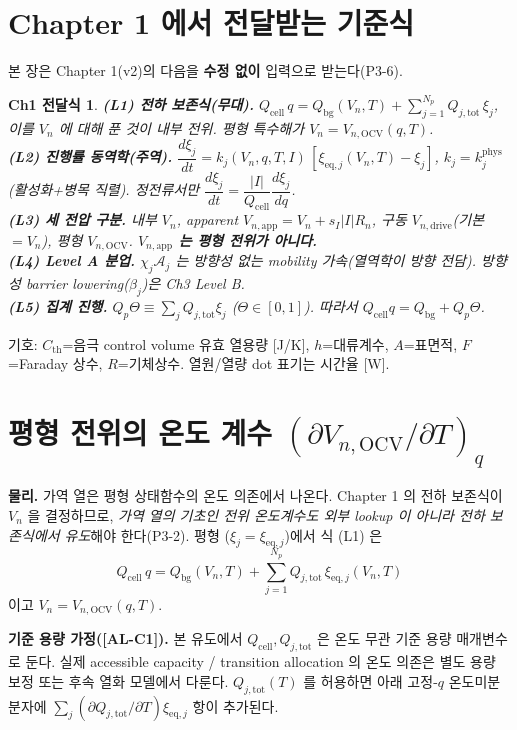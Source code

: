 \documentclass[11pt,a4paper]{article}
\newtheorem*{linkbox}{Ch1 전달식}
\newcommand{\eq}{\mathrm{eq}}
\newcommand{\app}{\mathrm{app}}
\newcommand{\drive}{\mathrm{drive}}
\newcommand{\tot}{\mathrm{tot}}
\newcommand{\bg}{\mathrm{bg}}
\newcommand{\cell}{\mathrm{cell}}
\newcommand{\OCV}{\mathrm{OCV}}
\newcommand{\AL}[1]{\textsf{[AL-#1]}}
\begin{document}
\section{Chapter 1 에서 전달받는 기준식}\label{sec:ch2_inherit}
본 장은 Chapter 1(v2)의 다음을 \textbf{수정 없이} 입력으로 받는다(P3-6).
\begin{linkbox}
\textbf{(L1) 전하 보존식(무대).} $Q_\cell\,q=Q_\bg(V_n,T)+\sum_{j=1}^{N_p}Q_{j,\tot}\,\xi_j$, 이를 $V_n$ 에
대해 푼 것이 내부 전위. 평형 특수해가 $V_n=V_{n,\OCV}(q,T)$.\\
\textbf{(L2) 진행률 동역학(주역).} $\dfrac{d\xi_j}{dt}=k_j(V_n,q,T,I)\,[\xi_{\eq,j}(V_n,T)-\xi_j]$,
$k_j=k_j^{\mathrm{phys}}$(활성화+병목 직렬). 정전류서만 $\dfrac{d\xi_j}{dt}=\dfrac{|I|}{Q_\cell}\dfrac{d\xi_j}{dq}$.\\
\textbf{(L3) 세 전압 구분.} 내부 $V_n$, apparent $V_{n,\app}=V_n+s_I|I|R_n$, 구동 $V_{n,\drive}$(기본 $=V_n$),
평형 $V_{n,\OCV}$. \textbf{$V_{n,\app}$ 는 평형 전위가 아니다.}\\
\textbf{(L4) Level A 분업.} $\chi_j\mathcal A_j$ 는 방향성 없는 mobility 가속(열역학이 방향 전담). 방향성
barrier lowering($\beta_j$)은 Ch3 Level B.\\
\textbf{(L5) 집계 진행.} $Q_p\Theta\equiv\sum_jQ_{j,\tot}\xi_j$ ($\Theta\in[0,1]$). 따라서
$Q_\cell q=Q_\bg+Q_p\Theta$.
\end{linkbox}
기호: $C_{\mathrm{th}}$=음극 control volume 유효 열용량 [J/K], $h$=대류계수, $A$=표면적, $F$=Faraday
상수, $R$=기체상수. 열원/열량 dot 표기는 시간율 [W].

\section{평형 전위의 온도 계수 $(\partial V_{n,\OCV}/\partial T)_q$}\label{sec:ch2_ocvT}
\textbf{물리.} 가역 열은 평형 상태함수의 온도 의존에서 나온다. Chapter 1 의 전하 보존식이 $V_n$ 을 결정하므로,
\emph{가역 열의 기초인 전위 온도계수도 외부 lookup 이 아니라 전하 보존식에서 유도}해야 한다(P3-2). 평형
($\xi_j=\xi_{\eq,j}$)에서 식 (L1) 은
\begin{equation}
Q_\cell\,q=Q_\bg(V_n,T)+\sum_{j=1}^{N_p}Q_{j,\tot}\,\xi_{\eq,j}(V_n,T)
\label{eq:ch2_eqbal}
\end{equation}
이고 $V_n=V_{n,\OCV}(q,T)$.

\textbf{기준 용량 가정(\AL{C1}).} 본 유도에서 $Q_\cell,Q_{j,\tot}$ 은 온도 무관 기준 용량 매개변수로 둔다.
실제 accessible capacity / transition allocation 의 온도 의존은 별도 용량 보정 또는 후속 열화 모델에서
다룬다. $Q_{j,\tot}(T)$ 를 허용하면 아래 고정-$q$ 온도미분 분자에 $\sum_j(\partial Q_{j,\tot}/\partial T)\xi_{\eq,j}$
항이 추가된다.
\end{document}
